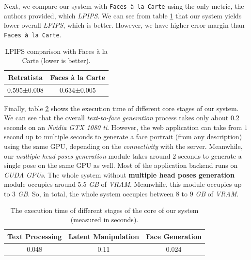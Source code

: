 Next, we compare our system with \texttt{Faces à la Carte} using the only metric, the authors provided, which \emph{LPIPS}. We can see from table \ref{tab:lpips_comp} that our system yields lower overall \emph{LPIPS}, which is better. However, we have higher error margin than \texttt{Faces à la Carte}.

\begin{table}[ht]
\centering
\caption{LPIPS comparison with Faces à la Carte (lower is better).}
\begin{tabular}[t]{| c | c |}
\hline
Retratista & Faces à la Carte \\
\hline
\hline
0.595±0.008 & 0.634±0.005 \\
\hline
\end{tabular}
\label{tab:lpips_comp}
\end{table}

Finally, table \ref{tab:exec_time} shows the execution time of different core stages of our system. We can see that the overall \emph{text-to-face generation} process takes only about $0.2$ seconds on an \emph{Nvidia GTX 1080 ti}. However, the web application can take from $1$ second up to multiple seconds to generate a face portrait (from any description) using the same GPU, depending on the \emph{connectivity} with the server. Meanwhile, our \emph{multiple head poses generation} module takes around $2$ seconds to generate a single pose on the same GPU as well. Most of the application backend runs on \emph{CUDA GPUs}. The whole system without \textbf{multiple head poses generation} module occupies around $5.5$ \emph{GB} of \emph{VRAM}. Meanwhile, this module occupies up to $3$ \emph{GB}. So, in total, the whole system occupies between $8$ to $9$ \emph{GB} of \emph{VRAM}.

\begin{table}[ht]
\centering
\caption{The execution time of different stages of the core of our system (measured in seconds).}
\begin{tabular}[t]{| c | c | c |}
\hline
Text Processing & Latent Manipulation & Face Generation \\
\hline
\hline
0.048 & 0.11 & 0.024 \\
\hline
\end{tabular}
\label{tab:exec_time}
\end{table}

